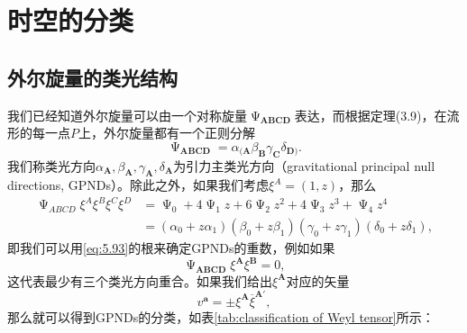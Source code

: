 \section{时空的分类}
\subsection{外尔旋量的类光结构}

我们已经知道外尔旋量可以由一个对称旋量$\upPsi _{\boldsymbol{ABCD}}$表达，而根据定理(3.9)，在流形的每一点$P$上，外尔旋量都有一个正则分解
\begin{equation*}
	\upPsi _{\boldsymbol{ABCD}} =\alpha _{(\boldsymbol{A}} \beta _{\boldsymbol{B}} \gamma _{\boldsymbol{C}} \delta _{\boldsymbol{D})} .
\end{equation*}
我们称类光方向$\alpha _{\boldsymbol{A}} ,\beta _{\boldsymbol{A}} ,\gamma _{\boldsymbol{A}} ,\delta _{\boldsymbol{A}}$为引力主类光方向（gravitational principal null directions, GPNDs）。除此之外，如果我们考虑$\xi ^{A} =( 1,z)$，那么
\begin{equation}
	\begin{aligned}
		\upPsi _{ABCD} \xi ^{A} \xi ^{B} \xi ^{C} \xi ^{D} & =\upPsi _{0} +4\upPsi _{1} z+6\upPsi _{2} z^{2} +4\upPsi _{3} z^{3} +\upPsi _{4} z^{4}\\
		& =(\alpha _{0} +z\alpha _{1} )(\beta _{0} +z\beta _{1} )(\gamma _{0} +z\gamma _{1} )(\delta _{0} +z\delta _{1} ),
	\end{aligned}
	\label{eq:5.93}
\end{equation}
即我们可以用\ref{eq:5.93}的根来确定GPNDs的重数，例如如果
\begin{equation*}
	\upPsi _{\boldsymbol{ABCD}} \xi ^{\boldsymbol{A}} \xi ^{\boldsymbol{B}} =0,
\end{equation*}
这代表最少有三个类光方向重合。如果我们给出$\xi ^{\boldsymbol{A}}$对应的矢量
\begin{equation*}
	v^{\boldsymbol{a}} =\pm \xi ^{\boldsymbol{A}}\overline{\xi }^{\boldsymbol{A} '} ,
\end{equation*}
那么就可以得到GPNDs的分类\parencite{petrov1966new}，如表\ref{tab:classification of Weyl tensor}所示：

